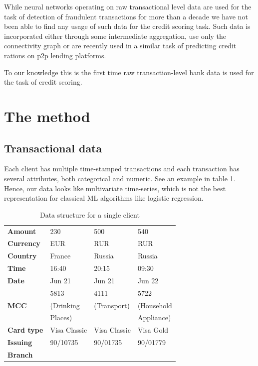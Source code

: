 \documentclass{sigkddExp}
\begin{document}
While neural networks operating on raw transactional level data are used for the task of detection of fraudulent transactions for more than a decade \cite{fraud_lstm} we have not been able to find any usage of such data for the credit scoring task. Such data is incorporated either through some intermediate aggregation, use only the connectivity graph\cite{RePEc} or are recently used in a similar task of predicting credit rations on p2p lending platforms.

To our knowledge this is the first time raw transaction-level bank data is used for the task of credit scoring. 

\section{The method}



\subsection{Transactional data}

Each client has multiple time-stamped transactions and each transaction has several attributes, both categorical and numeric. See an example in table \ref{tab1}. Hence, our data looks like multivariate time-series, which is not the best representation for classical ML algorithms like logistic regression.

\begin{table}
\caption{Data structure for a single client}
\begin{tabular}{ | l |  l l l | }
\hline
\textbf{Amount} & 230 & 500 & 540 \\
\textbf{Currency} & EUR & RUR & RUR \\
\textbf{Country} & France & Russia & Russia \\
\textbf{Time} & 16:40 & 20:15 & 09:30 \\
\textbf{Date} & Jun 21 & Jun 21 & Jun 22 \\
 & 5813 & 4111 & 5722 \\
\textbf{MCC} & (Drinking & (Transport) & (Household \\
 & Places) &  & Appliance) \\
\textbf{Card type} & Visa Classic & Visa Classic & Visa Gold \\
\textbf{Issuing} & 90/10735 & 90/01735 & 90/01779 \\
\textbf{Branch} &&& \\
\hline
\end{tabular}
\label{tab1}
\end{table}
\end{document}
